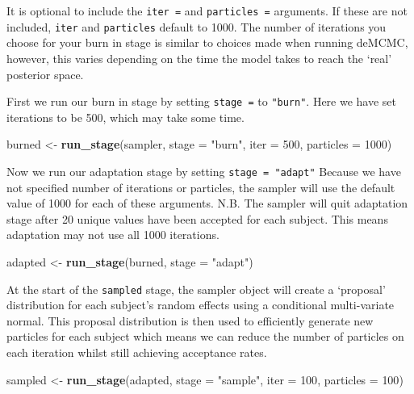 \documentclass[]{book}
\newenvironment{Shaded}{\begin{snugshade}}{\end{snugshade}}
\newcommand{\DataTypeTok}[1]{\textcolor[rgb]{0.13,0.29,0.53}{#1}}
\newcommand{\DecValTok}[1]{\textcolor[rgb]{0.00,0.00,0.81}{#1}}
\newcommand{\KeywordTok}[1]{\textcolor[rgb]{0.13,0.29,0.53}{\textbf{#1}}}
\newcommand{\NormalTok}[1]{#1}
\newcommand{\StringTok}[1]{\textcolor[rgb]{0.31,0.60,0.02}{#1}}
\begin{document}
It is optional to include the \texttt{iter\ =} and \texttt{particles\ =} arguments. If these are not included, \texttt{iter} and \texttt{particles} default to 1000. The number of iterations you choose for your burn in stage is similar to choices made when running deMCMC, however, this varies depending on the time the model takes to reach the `real' posterior space.

First we run our burn in stage by setting \texttt{stage\ =} to \texttt{"burn"}. Here we have set iterations to be 500, which may take some time.

\begin{Shaded}
\begin{Highlighting}[]
\NormalTok{burned <-}\StringTok{ }\KeywordTok{run_stage}\NormalTok{(sampler, }\DataTypeTok{stage =} \StringTok{"burn"}\NormalTok{, }\DataTypeTok{iter =} \DecValTok{500}\NormalTok{, }\DataTypeTok{particles =} \DecValTok{1000}\NormalTok{)}
\end{Highlighting}
\end{Shaded}

Now we run our adaptation stage by setting \texttt{stage\ =\ "adapt"} Because we have not specified number of iterations or particles, the sampler will use the default value of 1000 for each of these arguments. N.B. The sampler will quit adaptation stage after 20 unique values have been accepted for each subject. This means adaptation may not use all 1000 iterations.

\begin{Shaded}
\begin{Highlighting}[]
\NormalTok{adapted <-}\StringTok{ }\KeywordTok{run_stage}\NormalTok{(burned, }\DataTypeTok{stage =} \StringTok{"adapt"}\NormalTok{)}
\end{Highlighting}
\end{Shaded}

At the start of the \texttt{sampled} stage, the sampler object will create a `proposal' distribution for each subject's random effects using a conditional multi-variate normal. This proposal distribution is then used to efficiently generate new particles for each subject which means we can reduce the number of particles on each iteration whilst still achieving acceptance rates.

\begin{Shaded}
\begin{Highlighting}[]
\NormalTok{sampled <-}\StringTok{ }\KeywordTok{run_stage}\NormalTok{(adapted, }\DataTypeTok{stage =} \StringTok{"sample"}\NormalTok{, }\DataTypeTok{iter =} \DecValTok{100}\NormalTok{, }\DataTypeTok{particles =} \DecValTok{100}\NormalTok{)}
\end{Highlighting}
\end{Shaded}
\end{document}
